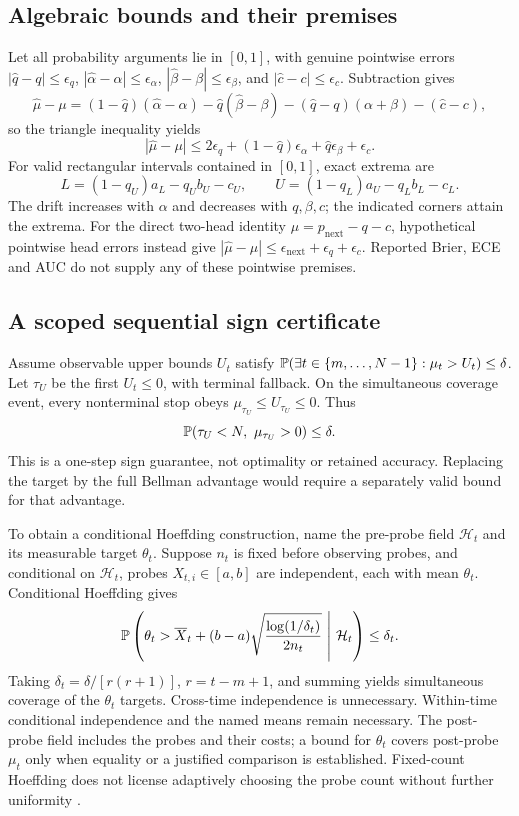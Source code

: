 \subsection{Algebraic bounds and their premises}
Let all probability arguments lie in \([0,1]\), with genuine pointwise errors
\(|\widehat q-q|\le\epsilon_q\),
\(|\widehat\alpha-\alpha|\le\epsilon_\alpha\),
\(|\widehat\beta-\beta|\le\epsilon_\beta\), and
\(|\widehat c-c|\le\epsilon_c\). Subtraction gives
\[
 \widehat\mu-\mu
 =(1-\widehat q)(\widehat\alpha-\alpha)
 -\widehat q(\widehat\beta-\beta)
 -(\widehat q-q)(\alpha+\beta)-(\widehat c-c),
\]
so the triangle inequality yields
\[
 |\widehat\mu-\mu|
 \le 2\epsilon_q+(1-\widehat q)\epsilon_\alpha
       +\widehat q\epsilon_\beta+\epsilon_c .
\]
For valid rectangular intervals contained in \([0,1]\), exact extrema are
\[
 L=(1-q_U)a_L-q_Ub_U-c_U,\qquad
 U=(1-q_L)a_U-q_Lb_L-c_L .
\]
The drift increases with \(\alpha\) and decreases with \(q,\beta,c\);
the indicated corners attain the extrema. For the direct two-head identity
\(\mu=p_{\mathrm{next}}-q-c\), hypothetical pointwise head errors instead
give \(|\widehat\mu-\mu|\le\epsilon_{\mathrm{next}}+\epsilon_q+\epsilon_c\).
Reported Brier, ECE and AUC do not supply any of these pointwise premises.

\subsection{A scoped sequential sign certificate}
Assume observable upper bounds \(U_t\) satisfy
\(\mathbb P(\exists t\in\{m,\ldots,N-1\}:\mu_t>U_t)\le\delta\).
Let \(\tau_U\) be the first \(U_t\le0\), with terminal fallback.
On the simultaneous coverage event, every nonterminal stop obeys
\(\mu_{\tau_U}\le U_{\tau_U}\le0\). Thus
\[
 \PP(\tau_U<N,\ \mu_{\tau_U}>0)\le\delta .
\]
This is a one-step sign guarantee, not optimality or retained accuracy.
Replacing the target by the full Bellman advantage would require a separately
valid bound for that advantage.

To obtain a conditional Hoeffding construction, name the pre-probe field
\(\mathcal H_t\) and its measurable target \(\theta_t\).
Suppose \(n_t\) is fixed before observing probes, and conditional on
\(\mathcal H_t\), probes \(X_{t,i}\in[a,b]\) are independent, each with mean
\(\theta_t\). Conditional Hoeffding gives
\[
 \mathbb P\left(\theta_t>\overline X_t+
 (b-a)\sqrt{\frac{\log(1/\delta_t)}{2n_t}}\ \middle|\ \mathcal H_t\right)
 \le\delta_t .
\]
Taking \(\delta_t=\delta/[r(r+1)]\), \(r=t-m+1\), and summing yields
simultaneous coverage of the \(\theta_t\) targets. Cross-time independence
is unnecessary. Within-time conditional independence and the named means
remain necessary. The post-probe field includes the probes and their costs;
a bound for \(\theta_t\) covers post-probe \(\mu_t\) only when equality or a
justified comparison is established. Fixed-count Hoeffding does not license
adaptively choosing the probe count without further uniformity
\citep{hoeffding1963,howard2021}.

